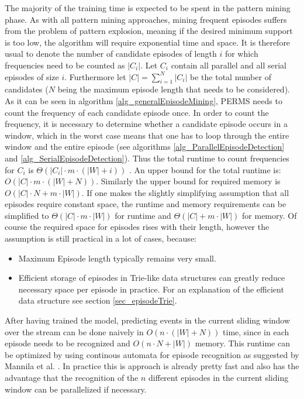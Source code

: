 The majority of the training time is expected to be spent in the pattern mining phase. As with all pattern mining approaches, mining frequent episodes suffers from the problem of pattern explosion, meaning if the desired minimum support is too low, the algorithm will require exponential time and space. It is therefore usual to denote the number of candidate episodes of length $i$ for which frequencies need to be counted as $|C_i|$. Let $C_i$ contain all parallel and all serial episodes of size $i$. Furthermore let $|C| = \sum_{i=1}^N |C_i|$ be the total number of candidates ($N$ being the maximum episode length that needs to be considered). As it can be seen in algorithm \ref{alg_generalEpisodeMining}, PERMS needs to count the frequency of each candidate episode once. In order to count the frequency, it is necessary to determine whether a candidate episode occurs in a window, which in the worst case means that one has to loop through the entire window and the entire episode (see algorithms \ref{alg_ParallelEpisodeDetection} and \ref{alg_SerialEpisodeDetection}). Thus the total runtime to count frequencies for $C_i$ is $\Theta(|C_i| \cdot m \cdot(|W| + i))$ . An upper bound for the total runtime is: $O(|C| \cdot m \cdot(|W| + N))$. Similarly the upper bound for required memory is $O(|C|\cdot N + m \cdot |W|)$. If one makes the slightly simplifying assumption that all episodes require constant space, the runtime and memory requirements can be simplified to $\Theta(|C| \cdot m \cdot |W| )$ for runtime and $\Theta(|C| + m \cdot |W|)$ for memory. Of course the required space for episodes rises with their length, however the assumption is still practical in a lot of cases, because:

\begin{itemize}
	\item Maximum Episode length typically remains very small.
	\item Efficient storage of episodes in Trie-like data structures can greatly reduce necessary space per episode in practice. For an explanation of the efficient data structure see section \ref{sec_episodeTrie}.
\end{itemize}

After having trained the model, predicting events in the current sliding window over the stream can be done naively in $O(n \cdot (|W|+N))$ time, since in each episode needs to be recognized and $O(n \cdot N + |W|)$ memory. This runtime can be optimized by using continous automata for episode recognition as suggested by Mannila et al. \cite{mannila1997discovery}. In practice this is approach is already pretty fast and also has the advantage that the recognition of the $n$ different episodes in the current sliding window can be parallelized if necessary.

